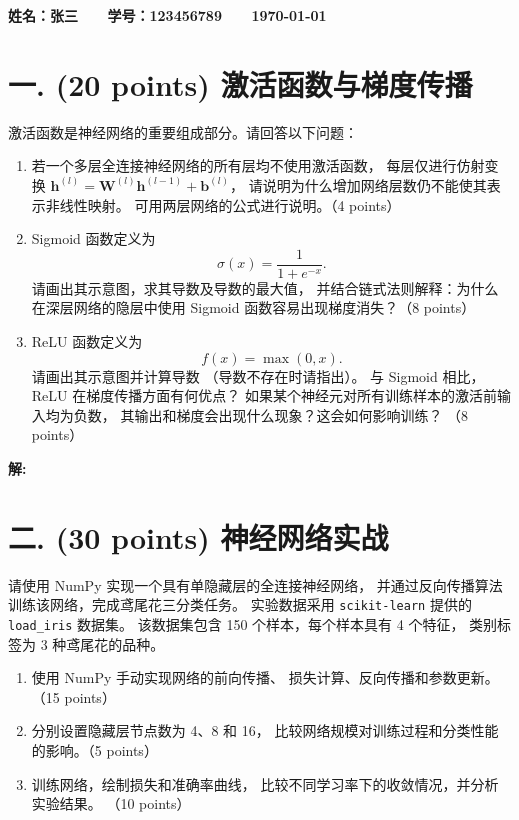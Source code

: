 \documentclass[8pt]{article}
\begin{document}
\textbf{\color{blue} \Large 姓名：张三 \ \ \ 学号：123456789 \ \ \ \today}



\section*{一. (20 points) 激活函数与梯度传播}

激活函数是神经网络的重要组成部分。请回答以下问题：

\begin{enumerate}
    \item 若一个多层全连接神经网络的所有层均不使用激活函数，
    每层仅进行仿射变换
    $\mathbf{h}^{(l)}=\mathbf{W}^{(l)}\mathbf{h}^{(l-1)}
    +\mathbf{b}^{(l)}$，
    请说明为什么增加网络层数仍不能使其表示非线性映射。
    可用两层网络的公式进行说明。（4 points）

    \item Sigmoid 函数定义为
    \begin{equation}
        \sigma(x)=\frac{1}{1+e^{-x}}.
    \end{equation}
    请画出其示意图，求其导数及导数的最大值，
    并结合链式法则解释：为什么在深层网络的隐层中使用
    Sigmoid 函数容易出现梯度消失？（8 points）

    \item ReLU 函数定义为
    \begin{equation}
        f(x)=\max(0,x).
    \end{equation}
    请画出其示意图并计算导数
    （导数不存在时请指出）。
    与 Sigmoid 相比，ReLU 在梯度传播方面有何优点？
    如果某个神经元对所有训练样本的激活前输入均为负数，
    其输出和梯度会出现什么现象？这会如何影响训练？
    （8 points）
\end{enumerate}


\textbf{\large 解:}

\newpage

\section*{二. (30 points) 神经网络实战}

请使用 NumPy 实现一个具有单隐藏层的全连接神经网络，
并通过反向传播算法训练该网络，完成鸢尾花三分类任务。
实验数据采用 \texttt{scikit-learn} 提供的
\texttt{load\_iris} 数据集。
该数据集包含 150 个样本，每个样本具有 4 个特征，
类别标签为 3 种鸢尾花的品种。

\begin{enumerate}
    \item 使用 NumPy 手动实现网络的前向传播、
    损失计算、反向传播和参数更新。（15 points）

    \item 分别设置隐藏层节点数为 4、8 和 16，
    比较网络规模对训练过程和分类性能的影响。（5 points）

    \item 训练网络，绘制损失和准确率曲线，
    比较不同学习率下的收敛情况，并分析实验结果。
    （10 points）
\end{enumerate}
\end{document}
